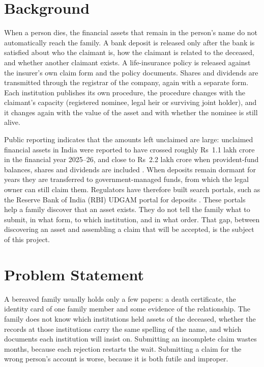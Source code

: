 \documentclass[12pt,a4paper,oneside]{report}
\begin{document}
\section{Background}
When a person dies, the financial assets that remain in the person's name do not automatically reach the family. A bank deposit is released only after the bank is satisfied about who the claimant is, how the claimant is related to the deceased, and whether another claimant exists. A life-insurance policy is released against the insurer's own claim form and the policy documents. Shares and dividends are transmitted through the registrar of the company, again with a separate form. Each institution publishes its own procedure, the procedure changes with the claimant's capacity (registered nominee, legal heir or surviving joint holder), and it changes again with the value of the asset and with whether the nominee is still alive.

Public reporting indicates that the amounts left unclaimed are large: unclaimed financial assets in India were reported to have crossed roughly Rs~1.1 lakh crore in the financial year 2025--26, and close to Rs~2.2 lakh crore when provident-fund balances, shares and dividends are included \cite{lapaas2026,bt2026}. When deposits remain dormant for years they are transferred to government-managed funds, from which the legal owner can still claim them. Regulators have therefore built search portals, such as the Reserve Bank of India (RBI) UDGAM portal for deposits \cite{rbi_udgam}. These portals help a family discover that an asset exists. They do not tell the family what to submit, in what form, to which institution, and in what order. That gap, between discovering an asset and assembling a claim that will be accepted, is the subject of this project.

\section{Problem Statement}
A bereaved family usually holds only a few papers: a death certificate, the identity card of one family member and some evidence of the relationship. The family does not know which institutions held assets of the deceased, whether the records at those institutions carry the same spelling of the name, and which documents each institution will insist on. Submitting an incomplete claim wastes months, because each rejection restarts the wait. Submitting a claim for the wrong person's account is worse, because it is both futile and improper.
\end{document}
